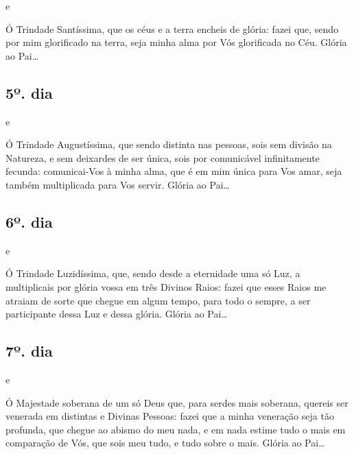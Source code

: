 \documentclass[18pt]{article}
\begin{document}
\textbf{} e  \textbf{} 

Ó Trindade Santíssima, que os céus e a terra encheis de glória: fazei que, sendo por mim glorificado na terra, seja minha alma por Vós glorificada no Céu.
Glória ao Pai…

\textbf{}

\subsection*{5º. dia}

\textbf{} e  \textbf{} 

Ó Trindade Augustíssima, que sendo distinta nas pessoas, sois sem divisão na Natureza, e sem deixardes de ser única, sois por comunicável infinitamente fecunda: comunicai-Vos à minha alma, que é em mim única para Vos amar, seja também multiplicada para Vos servir.
Glória ao Pai…

\textbf{}

\subsection*{6º. dia}

\textbf{} e  \textbf{} 

Ó Trindade Luzidíssima, que, sendo desde a eternidade uma só Luz, a multiplicais por glória vossa em três Divinos Raios: fazei que esses Raios me atraiam de sorte que chegue em algum tempo, para todo o sempre, a ser participante dessa Luz e dessa glória.
Glória ao Pai…

\textbf{}

\subsection*{7º. dia}

\textbf{} e  \textbf{} 

Ó Majestade soberana de um só Deus que, para serdes mais soberana, quereis ser venerada em distintas e Divinas Pessoas: fazei que a minha veneração seja tão profunda, que chegue ao abismo do meu nada, e em nada estime tudo o mais em comparação de Vós, que sois meu tudo, e tudo sobre o mais.
Glória ao Pai…

\textbf{}
\end{document}
